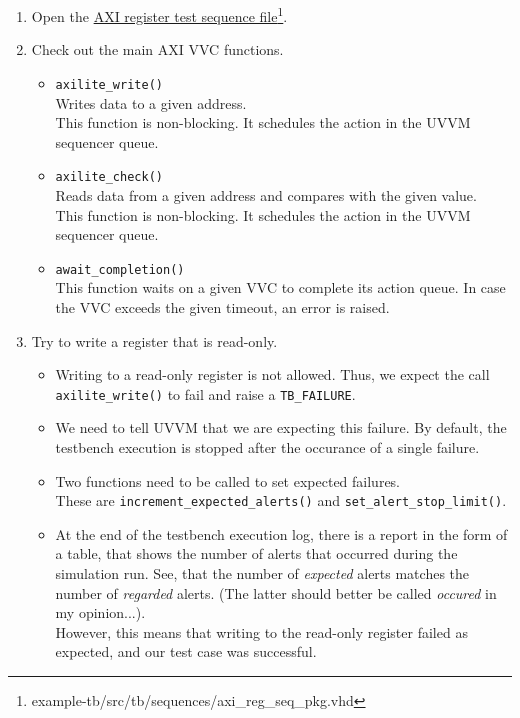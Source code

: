 \begin{enumerate}
      \item Open the \href{../../example-tb/src/tb/sequences/axi\_reg\_seq\_pkg.vhd} {AXI register test sequence file}\footnote{example-tb/src/tb/sequences/axi\_reg\_seq\_pkg.vhd}.
      \item Check out the main AXI VVC functions.
            \begin{itemize}
                  \item \texttt{axilite\_write()}\\
                        Writes data to a given address.\\
                        This function is non-blocking. It schedules the action in the UVVM sequencer queue.
                  \item \texttt{axilite\_check()}\\
                        Reads data from a given address and compares with the given value.\\
                        This function is non-blocking. It schedules the action in the UVVM sequencer queue.
                  \item \texttt{await\_completion()}\\
                        This function waits on a given VVC to complete its action queue. In case the VVC exceeds the given timeout, an error is raised.\\
            \end{itemize}
      \item Try to write a register that is read-only.
            \begin{itemize}
                  \item Writing to a read-only register is not allowed. Thus, we expect the call \texttt{axilite\_write()} to fail and raise a \texttt{TB\_FAILURE}.
                  \item We need to tell UVVM that we are expecting this failure. By default, the testbench execution is stopped after the occurance of a single failure.
                  \item Two functions need to be called to set expected failures. \\These are \texttt{increment\_expected\_alerts()} and \texttt{set\_alert\_stop\_limit()}.
                  \item At the end of the testbench execution log, there is a report in the form of a table, that shows the number of alerts that occurred during the simulation run. See, that the number of \textit{expected} alerts matches the number of \textit{regarded} alerts. (The latter should better be called \textit{occured} in my opinion...).\\
                        However, this means that writing to the read-only register failed as expected, and our test case was successful.
            \end{itemize}
\end{enumerate}

